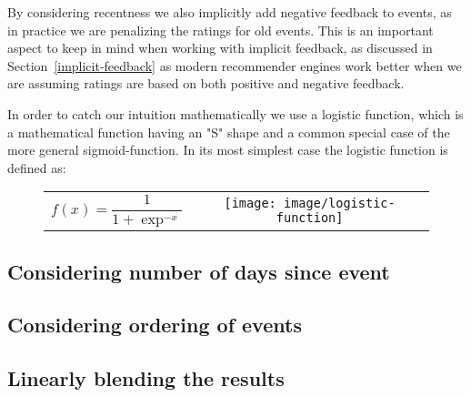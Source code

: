 By considering recentness we also implicitly add negative feedback to events,
as in practice we are penalizing the ratings for old events. This is an
important aspect to keep in mind when working with implicit feedback, as
discussed in Section~\ref{implicit-feedback} as modern recommender engines work
better when we are assuming ratings are based on both positive and negative
feedback.

In order to catch our intuition mathematically we use a logistic function, which
is a mathematical function having an "S" shape and a common special case of the
more general sigmoid-function. In its most simplest case the logistic function
is defined as:

\begin{figure}[h!]
  \center
  \begin{tabular}{m{5cm}c}
    \toprule
    \begin{equation*}
      f(x) = \frac{1}{1+\exp^{-x}}
    \end{equation*}
  &
    \texttt{[image: image/logistic-function]}
  \end{tabular}
\end{figure}


\subsection{Considering number of days since event}

\subsection{Considering ordering of events}

\subsection{Linearly blending the results}
